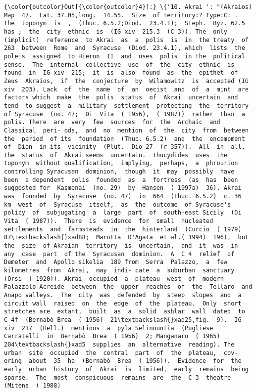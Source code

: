\documentclass[11pt]{article}
\begin{document}
            \begin{Verbatim}[commandchars=\\\{\}]
{\color{outcolor}Out[{\color{outcolor}4}]:} \{'10. Akrai ': "(Akraios) Map  47.  Lat. 37.05,long.  14.55.  Size  of territory:? Type:C: .  The  toponym  is  ,  (Thuc. 6.5.2;Diod.  23.4.1);  Steph.  Byz. 62.5  has ;  the  city- ethnic  is  (IG xiv  215.3  (C 3)). The  only  (implicit)  reference  to Akrai  as  a  polis  is  in  the treaty  of 263  between  Rome  and  Syracuse  (Diod. 23.4.1), which  lists  the  poleis  assigned  to Hieron  II  and  uses  polis  in the  political  sense.  The  internal  collective  use  of  the  city- ethnic  is  found  in  IG xiv  215;  it  is  also  found  as  the  epithet  of Zeus  Akraios,  if  the  conjecture  by  Wilamowitz  is  accepted (IG xiv  203). Lack  of  the  name  of  an  oecist  and  of  a  mint  are  factors which  make  the  polis  status  of  Akrai  uncertain  and  tend  to suggest  a  military  settlement  protecting  the  territory  of Syracuse  (no. 47;  Di  Vita  ( 1956),  ( 1987))  rather  than  a  polis. There  are  very  few  sources  for  the  Archaic  and  Classical  peri- ods,  and  no  mention  of  the  city  from  between  the  period  of its  foundation  (Thuc. 6.5.2)  and  the  encampment  of  Dion  in its  vicinity  (Plut.  Dio 27  (r 357)).  All  in  all,  the  status  of  Akrai seems  uncertain.  Thucydides  uses  the  toponym  without qualification,  implying,  perhaps,  a  phrourion  controlling Syracusan  dominion,  though  it  may  possibly  have  been  a dependent  polis  founded  as  a  fortress  (as  has  been  suggested for  Kasmenai  (no. 29)  by  Hansen  ( 1997a)  36). Akrai  was  founded  by  Syracuse  (no. 47)  in  664  (Thuc. 6.5.2)  c. 36  km  west  of  Syracuse  itself,  as  the  outcome  of Syracuse's  policy  of  subjugating  a  large  part  of  south-east Sicily  (Di  Vita  ( 1987)).  There  is  evidence  for  small  nucleated settlements  and  farmsteads  in  the  hinterland  (Curcio  ( 1979) 87\textbackslash{}xad88;  Marotta  D'Agata  et al.( 1994)  196),  but  the  size  of Akraian  territory  is  uncertain,  and  it  was  in  any  case  part  of the  Syracusan  dominion.  A  C 4  relief  of  Demeter  and  Apollo sikelia  189 from  Serra  Palazzo,  a  few  kilometres  from  Akrai,  may  indi- cate  a  suburban  sanctuary  (Orsi  ( 1920)). Akrai  occupied  a  plateau  west  of  modern  Palazzolo Acreide  between  the  upper  reaches  of  the  Tellaro  and  Anapo valleys.  The  city  was  defended  by  steep  slopes  and  a  circuit wall  raised  on  the  edge  of  the  plateau.  Only  short  stretches are  extant,  built  as  a  solid  ashlar  wall  dated  to  C 4f  (Bernabò Brea  ( 1956)  21\textbackslash{}xad25,fig.  9).  IG xiv  217  (Hell.)  mentions  a  pyla Selinountia  (Pugliese  Carratelli  in  Bernabò  Brea  ( 1956)  2; Manganaro  ( 1965)  204\textbackslash{}xad5  supplies  an  alternative  reading). The  urban  site  occupied  the  central  part  of  the  plateau,  cov- ering  about  35  ha  (Bernabò  Brea  ( 1956)).  Evidence  for  the early  urban  history  of  Akrai  is  limited,  early  remains  being sparse.  The  most  conspicuous  remains  are  the  C 3  theatre (Mitens  ( 1988)  
\end{Verbatim}
\end{document}
